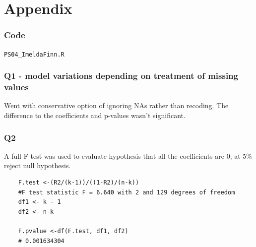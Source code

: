 \documentclass[12pt,letterpaper]{article}
\begin{document}
\newpage
\section{Appendix}
  \subsubsection{Code}
  \verb|PS04_ImeldaFinn.R|
  
  
  \subsubsection*{Q1 - model variations depending on treatment of missing values}
  
  Went with conservative option of ignoring NAs rather than recoding.  
  The difference to the coefficients and p-values wasn't significant.
	 


  

  \subsubsection*{Q2}

	A full F-test was used to evaluate hypothesis that all the coefficients are 0; at 5\% reject null hypothesis.
	
	\begin{lstlisting}
  	F.test <-(R2/(k-1))/((1-R2)/(n-k))
    #F test statistic F = 6.640 with 2 and 129 degrees of freedom
    df1 <- k - 1
    df2 <- n-k

    F.pvalue <-df(F.test, df1, df2)
    # 0.001634304
	\end{lstlisting}
\end{document}
